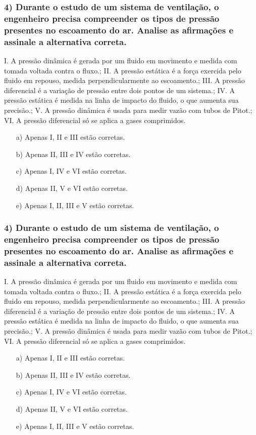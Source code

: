 \documentclass[12pt]{beamer}
\begin{document}
\begin{frame}
\frametitle{4) Durante o estudo de um sistema de ventilação, o engenheiro precisa compreender os tipos de pressão presentes no escoamento do ar. Analise as afirmações e assinale a alternativa correta.}
{\BodySize
\par I. A pressão dinâmica é gerada por um fluido em movimento e medida com tomada voltada contra o fluxo.; II. A pressão estática é a força exercida pelo fluido em repouso, medida perpendicularmente ao escoamento.; III. A pressão diferencial é a variação de pressão entre dois pontos de um sistema.; IV. A pressão estática é medida na linha de impacto do fluido, o que aumenta sua precisão.; V. A pressão dinâmica é usada para medir vazão com tubos de Pitot.; VI. A pressão diferencial só se aplica a gases comprimidos.
\begin{itemize}
\item[a)] Apenas I, II e III estão corretas.
\item[b)] Apenas II, III e IV estão corretas.
\item[c)] Apenas I, IV e VI estão corretas.
\item[d)] Apenas II, V e VI estão corretas.
\item[e)] Apenas I, II, III e V estão corretas.
\end{itemize}
}
\end{frame}

\begin{frame}
\frametitle{4) Durante o estudo de um sistema de ventilação, o engenheiro precisa compreender os tipos de pressão presentes no escoamento do ar. Analise as afirmações e assinale a alternativa correta.}
{\BodySize
\par I. A pressão dinâmica é gerada por um fluido em movimento e medida com tomada voltada contra o fluxo.; II. A pressão estática é a força exercida pelo fluido em repouso, medida perpendicularmente ao escoamento.; III. A pressão diferencial é a variação de pressão entre dois pontos de um sistema.; IV. A pressão estática é medida na linha de impacto do fluido, o que aumenta sua precisão.; V. A pressão dinâmica é usada para medir vazão com tubos de Pitot.; VI. A pressão diferencial só se aplica a gases comprimidos.
\begin{itemize}
\item[a)] Apenas I, II e III estão corretas.
\item[b)] Apenas II, III e IV estão corretas.
\item[c)] Apenas I, IV e VI estão corretas.
\item[d)] Apenas II, V e VI estão corretas.
\item[e)] \alert{Apenas I, II, III e V estão corretas.}
\end{itemize}
}
\end{frame}
\end{document}
